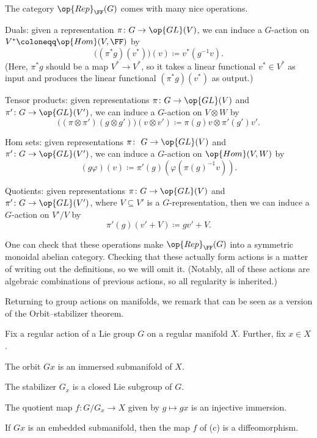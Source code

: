 \documentclass[../notes.tex]{subfiles}
\begin{document}
\begin{remark} \label{rem:rep-operations}
	The category $\op{Rep}_{\FF}(G)$ comes with many nice operations.
	\begin{listalph}
		\item Duals: given a representation $\pi\colon G\to\op{GL}(V)$, we can induce a $G$-action on $V^*\coloneqq\op{Hom}(V,\FF)$ by
		\[\big((\pi^*g)(v^*)\big)(v)\coloneqq v^*\left(g^{-1}v\right).\]
		(Here, $\pi^*g$ should be a map $V^*\to V^*$, so it takes a linear functional $v^*\in V^*$ as input and produces the linear functional $(\pi^*g)(v^*)$ as output.)
		\item Tensor products: given representations $\pi\colon G\to\op{GL}(V)$ and $\pi'\colon G\to\op{GL}(V')$, we can induce a $G$-action on $V\otimes W$ by
		\[\big((\pi\otimes\pi')(g\otimes g')\big)(v\otimes v')\coloneqq\pi(g)v\otimes\pi'(g')v'.\]
		\item Hom sets: given representations $\pi\colon\ G\to\op{GL}(V)$ and $\pi'\colon G\to\op{GL}(V')$, we can induce a $G$-action on $\op{Hom}(V,W)$ by
		\[(g\varphi)(v)\coloneqq\pi'(g)\left(\varphi(\pi(g)^{-1}v)\right).\]
		\item Quotients: given representations $\pi\colon G\to\op{GL}(V)$ and $\pi'\colon G\to\op{GL}(V')$, where $V\subseteq V'$ is a $G$-representation, then we can induce a $G$-action on $V'/V$ by
		\[\pi'(g)(v'+V)\coloneqq gv'+V.\]
	\end{listalph}
	One can check that these operations make $\op{Rep}_{\FF}(G)$ into a symmetric monoidal abelian category. Checking that these actually form actions is a matter of writing out the definitions, so we will omit it. (Notably, all of these actions are algebraic combinations of previous actions, so all regularity is inherited.)
\end{remark}
Returning to group actions on manifolds, we remark that  can be seen as a version of the Orbit--stabilizer theorem.
\begin{theorem} \label{thm:orb-stab}
	Fix a regular action of a Lie group $G$ on a regular manifold $X$. Further, fix $x\in X$.
	\begin{listalph}
		\item The orbit $Gx$ is an immersed submanifold of $X$.
		\item The stabilizer $G_x$ is a closed Lie subgroup of $G$.
		\item The quotient map $f\colon G/G_x\to X$ given by $g\mapsto gx$ is an injective immersion.
		\item If $Gx$ is an embedded submanifold, then the map $f$ of (c) is a diffeomorphism.
	\end{listalph}
\end{theorem}
\end{document}
